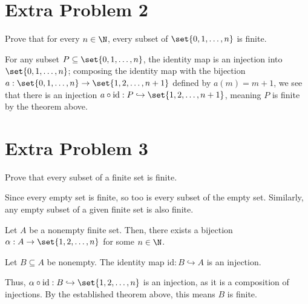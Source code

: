 \documentclass[10pt]{mypackage}
\begin{document}
\section{Extra Problem 2}%
\begin{problem}
  Prove that for every $n\in \N$, every subset of $\set{0,1,\dots,n}$ is finite.
\end{problem}
\begin{solution}
  For any subset $P\subseteq \set{0,1,\dots,n}$, the identity map is an injection into $\set{0,1,\dots,n}$; composing the identity map with the bijection $a: \set{0,1,\dots,n} \rightarrow \set{1,2,\dots,n+1}$ defined by $a(m) = m+1$, we see that there is an injection $a\circ \text{id}: P\hookrightarrow \set{1,2,\dots,n+1}$, meaning $P$ is finite by the theorem above.
\end{solution}

\section{Extra Problem 3}%
\begin{problem}
  Prove that every subset of a finite set is finite.
\end{problem}
\begin{solution}
  Since every empty set is finite, so too is every subset of the empty set. Similarly, any empty subset of a given finite set is also finite.\newline

  Let $A$ be a nonempty finite set. Then, there exists a bijection $\alpha: A\rightarrow \set{1,2,\dots,n}$ for some $n\in\N$.\newline

  Let $B\subseteq A$ be nonempty. The identity map $\text{id}: B\hookrightarrow A$ is an injection.\newline

  Thus, $\alpha \circ \text{id}: B\hookrightarrow \set{1,2,\dots,n}$ is an injection, as it is a composition of injections. By the established theorem above, this means $B$ is finite.
\end{solution}
\end{document}
